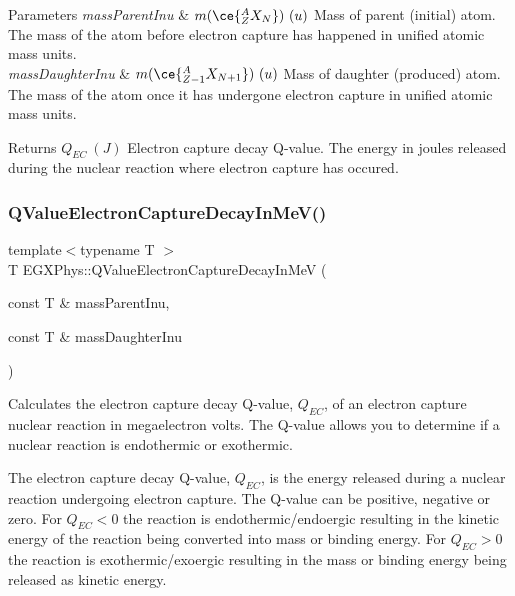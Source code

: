 \begin{DoxyParams}{Parameters}
{\em mass\+Parent\+Inu} & $m(\ce{ ^{A}_{Z}X_{N} })\ (u)$ Mass of parent (initial) atom. The mass of the atom before electron capture has happened in unified atomic mass units. \\
\hline
{\em mass\+Daughter\+Inu} & $m(\ce{ ^{A}_{Z-1}X_{N{+1}} })\ (u)$ Mass of daughter (produced) atom. The mass of the atom once it has undergone electron capture in unified atomic mass units. \\
\hline
\end{DoxyParams}
\begin{DoxyReturn}{Returns}
$Q_{EC}\ (J)$ Electron capture decay Q-\/value. The energy in joules released during the nuclear reaction where electron capture has occured. 
\end{DoxyReturn}
\mbox{\label{group___q_value_ga9a6b76207e2ec60fd0ee3511582f9e26}} 
\subsubsection{\texorpdfstring{Q\+Value\+Electron\+Capture\+Decay\+In\+Me\+V()}{QValueElectronCaptureDecayInMeV()}}
{\footnotesize\ttfamily template$<$typename T $>$ \\
T E\+G\+X\+Phys\+::\+Q\+Value\+Electron\+Capture\+Decay\+In\+MeV (\begin{DoxyParamCaption}\item[{const T \&}]{mass\+Parent\+Inu,  }\item[{const T \&}]{mass\+Daughter\+Inu }\end{DoxyParamCaption})}



Calculates the electron capture decay Q-\/value, $Q_{EC}$, of an electron capture nuclear reaction in megaelectron volts. The Q-\/value allows you to determine if a nuclear reaction is endothermic or exothermic. 

The electron capture decay Q-\/value, $Q_{EC}$, is the energy released during a nuclear reaction undergoing electron capture. The Q-\/value can be positive, negative or zero. For $Q_{EC} < 0$ the reaction is endothermic/endoergic resulting in the kinetic energy of the reaction being converted into mass or binding energy. For $Q_{EC} > 0$ the reaction is exothermic/exoergic resulting in the mass or binding energy being released as kinetic energy.

